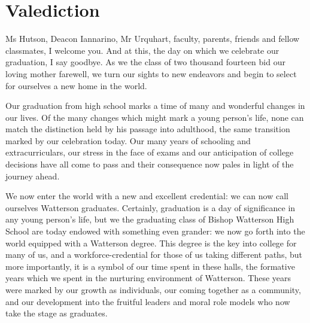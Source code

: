 \documentclass{report}
\begin{document}
\section*{Valediction}

Ms Hutson, Deacon Iannarino, Mr Urquhart, faculty, parents, friends and fellow
classmates, I welcome you. And at this, the day on which we celebrate our
graduation, I say goodbye. As we the class of two thousand fourteen bid our
loving mother farewell, we turn our sights to new endeavors and begin to select
for ourselves a new home in the world.

Our graduation from high school marks a time of many and wonderful changes in
our lives. Of the many changes which might mark a young person's life, none can
match the distinction held by his passage into adulthood, the same transition
marked by our celebration today. Our many years of schooling and
extracurriculars, our stress in the face of exams and our anticipation of
college decisions have all come to pass and their consequence now pales in light
of the journey ahead. 

We now enter the world with a new and excellent credential: we can now call
ourselves Watterson graduates. Certainly, graduation is a day of significance
in any young person's life, but we the graduating class of Bishop Watterson
High School are today endowed with something even grander: we now go forth into
the world equipped with a Watterson degree. This degree is the key into college
for many of us, and a workforce-credential for those of us taking different
paths, but more importantly, it is a symbol of our time spent in these halls,
the formative years which we spent in the nurturing environment of Watterson.
These years were marked by our growth as individuals, our coming together as a
community, and our development into the fruitful leaders and moral role models
who now take the stage as graduates.
\end{document}

